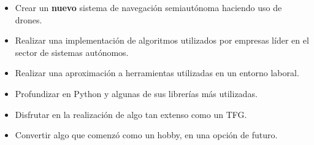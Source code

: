 \begin{itemize}
\item Crear un \textbf{nuevo} sistema de navegación semiautónoma haciendo uso de drones.
\item Realizar una implementación de algoritmos utilizados por empresas líder en el sector de sistemas autónomos.
\item Realizar una aproximación a herramientas utilizadas en un entorno laboral.
\item Profundizar en Python y algunas de sus librerías más utilizadas.
\item Disfrutar en la realización de algo tan extenso como un TFG.
\item Convertir algo que comenzó como un hobby, en una opción de futuro.
\end{itemize}